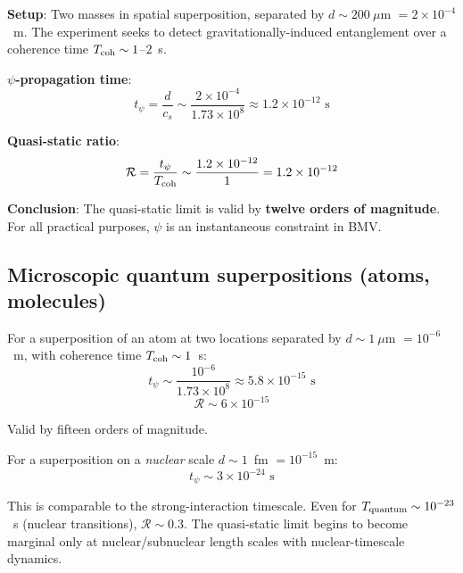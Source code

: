 \documentclass[12pt,a4paper]{article}
\begin{document}
\begin{tcolorbox}[colback=green!5!white, colframe=green!60!black,
title=BMV: Quasi-Static Assessment]
\textbf{Setup}: Two masses in spatial superposition, separated by
$d \sim 200~\mu$m $= 2 \times 10^{-4}$~m. The experiment seeks to detect
gravitationally-induced entanglement over a coherence time
$T_{\rm coh} \sim 1$--$2$~s.

\textbf{$\psi$-propagation time}:
\begin{equation}
t_\psi = \frac{d}{c_s} \sim \frac{2 \times 10^{-4}}{1.73 \times 10^8}
\approx 1.2 \times 10^{-12}\text{ s}
\end{equation}

\textbf{Quasi-static ratio}:
\begin{equation}
\mathcal{R} = \frac{t_\psi}{T_{\rm coh}}
\sim \frac{1.2 \times 10^{-12}}{1} = 1.2 \times 10^{-12}
\end{equation}

\textbf{Conclusion}: The quasi-static limit is valid by \textbf{twelve
orders of magnitude}. For all practical purposes, $\psi$ is an instantaneous
constraint in BMV.
\end{tcolorbox}

\subsection{Microscopic quantum superpositions (atoms, molecules)}

For a superposition of an atom at two locations separated by
$d \sim 1~\mu$m $= 10^{-6}$~m, with coherence time $T_{\rm coh} \sim 1$~s:
\begin{equation}
t_\psi \sim \frac{10^{-6}}{1.73 \times 10^8} \approx 5.8 \times 10^{-15}\text{ s}
\end{equation}
\begin{equation}
\mathcal{R} \sim 6 \times 10^{-15}
\end{equation}

Valid by fifteen orders of magnitude.

For a superposition on a \emph{nuclear} scale $d \sim 1$~fm $= 10^{-15}$~m:
\begin{equation}
t_\psi \sim 3 \times 10^{-24}\text{ s}
\end{equation}

This is comparable to the strong-interaction timescale. Even for
$T_{\rm quantum} \sim 10^{-23}$~s (nuclear transitions), $\mathcal{R} \sim 0.3$.
The quasi-static limit begins to become marginal only at nuclear/subnuclear
length scales with nuclear-timescale dynamics.
\end{document}
